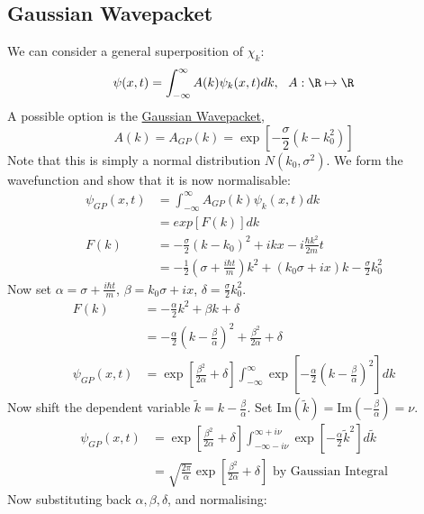 \documentclass[../Main.tex]{subfiles}
\begin{document}
\subsection{Gaussian Wavepacket}
We can consider a general superposition of $\chi_k$:
\begin{equation*}
    \psi(x, t) = \int_{-\infty}^{\infty} A(k) \psi_k(x, t) dk,~~A : \R \mapsto \R
\end{equation*}
A possible option is the \underline{Gaussian Wavepacket},
\begin{equation}
    A(k) = A_{GP}(k) = \exp\left[-\frac{\sigma}{2} (k - k_0^2)\right]
    \label{eqnGaussWP}
\end{equation}
Note that this is simply a normal distribution $N(k_0, \sigma^2)$. We form the wavefunction and show that it is now normalisable:
\begin{align*}
    \psi_{GP}(x, t) &= \int_{-\infty}^{\infty} A_{GP}(k) \psi_k(x, t) dk \\
    &= exp\left[F(k)\right] dk \\
    F(k) &= -\frac\sigma2 (k - k_0)^2 + ikx - i \frac{\hbar k^2}{2m}t \\
    &= -\frac12\left(\sigma + \frac{i\hbar t}{m}\right)k^2 + \left(k_0 \sigma + ix\right)k - \frac{\sigma}{2} k_0^2
\end{align*}
Now set $\alpha = \sigma + \frac{i\hbar t}{m}$, $\beta = k_0 \sigma + ix$, $\delta = \frac{\sigma}{2} k_0^2$.
\begin{align*}
    F(k) &= -\frac\alpha2 k^2 + \beta k + \delta \\
    &= -\frac{\alpha}{2} \left(k - \frac{\beta}{\alpha}\right)^2 + \frac{\beta^2}{2\alpha} + \delta \\
    \psi_{GP}(x, t) &= \exp\left[\frac{\beta^2}{2\alpha} + \delta\right] \int_{-\infty}^{\infty} \exp\left[-\frac{\alpha}{2} \left(k - \frac\beta\alpha\right)^2\right] dk 
\end{align*}
Now shift the dependent variable $\tilde{k} = k - \frac{\beta}{\alpha}$. Set $\text{Im}(\tilde{k}) = \text{Im}(-\frac\beta\alpha) = \nu$.
\begin{align*}
    \psi_{GP}(x, t) &= \exp\left[\frac{\beta^2}{2\alpha}+ \delta\right] \int_{-\infty - i \nu}^{\infty + i \nu} \exp\left[-\frac{\alpha}{2}\tilde{k}^2\right] d\tilde{k} \\
    &= \sqrt{\frac{2\pi}{\alpha}} \exp\left[\frac{\beta^2}{2\alpha} + \delta\right] \text{ by Gaussian Integral}
\end{align*}
Now substituting back $\alpha, \beta, \delta$, and normalising:
\end{document}
